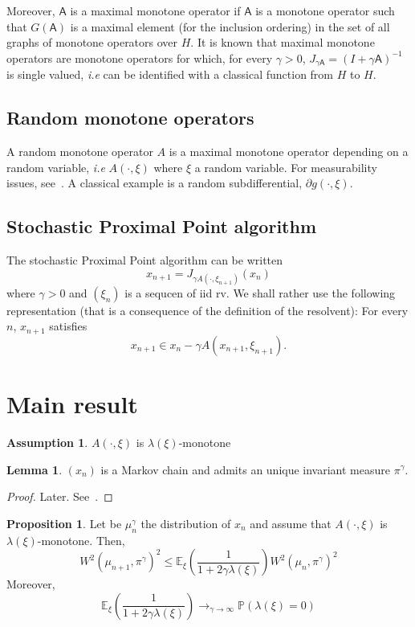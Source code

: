 \documentclass{article}
\newcommand{\1}{\mathbbm 1}
\newcommand{\bP}{{{\mathbb P}}}
\newcommand{\bE}{{{\mathbb E}}}
\newcommand{\sA}{{\mathsf A}}
\theoremstyle{definition}
\newtheorem{lemma}[theorem]{Lemma}
\newtheorem{proposition}[theorem]{Proposition}
\newtheorem{assumption}{Assumption}
\begin{document}
Moreover, $\sA$ is a maximal monotone operator if $\sA$ is a monotone operator such that $G(\sA)$ is a maximal element (for the inclusion ordering) in the set of all graphs of monotone operators over $H$. It is known that maximal monotone operators are monotone operators for which, for every $\gamma > 0$, $J_{\gamma \sA} = (I + \gamma \sA)^{-1}$ is single valued, \textit{i.e} can be identified with a classical function from $H$ to $H$.

\subsection{Random monotone operators}
A random monotone operator $A$ is a maximal monotone operator depending on a random variable, \textit{i.e} $A(\cdot,\xi)$ where $\xi$ a random variable. For measurability issues, see~\cite{bia-hac-16}. A classical example is a random subdifferential, $\partial g(\cdot,\xi)$. 
\subsection{Stochastic Proximal Point algorithm}

The stochastic Proximal Point algorithm can be written
\begin{equation}
\label{eq:spp}
    x_{n+1} = J_{\gamma A(\cdot,\xi_{n+1})}(x_n)
\end{equation}
where $\gamma >0$ and $(\xi_n)$ is a sequcen of iid rv.
We shall rather use the following representation (that is a consequence of the definition of the resolvent): For every $n$, $x_{n+1}$ satisfies
\begin{equation}
    x_{n+1} \in x_n - \gamma A(x_{n+1},\xi_{n+1}).
\end{equation}

\section{Main result}
\begin{assumption}
$A(\cdot,\xi)$ is $\lambda(\xi)$-monotone
\end{assumption}

\begin{lemma}
$(x_n)$ is a Markov chain and admits an unique invariant measure $\pi^\gamma$.
\end{lemma}
\begin{proof}
Later. See~\cite{duf-livre97}.
\end{proof}

\begin{proposition}
Let be $\mu_n^\gamma$ the distribution of $x_n$ and assume that $A(\cdot,\xi)$ is $\lambda(\xi)$-monotone. Then,
\begin{equation}
    W^2(\mu_{n+1},\pi^\gamma)^2 \leq \bE_\xi\left(\frac{1}{1+2\gamma\lambda(\xi)}\right) W^2(\mu_{n},\pi^\gamma)^2
\end{equation}
Moreover, \begin{equation}
    \bE_\xi\left(\frac{1}{1+2\gamma\lambda(\xi)}\right) \longrightarrow_{\gamma \to \infty} \bP(\lambda(\xi) = 0)
\end{equation} 
\end{proposition}
\end{document}
